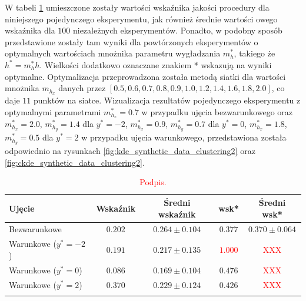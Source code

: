\documentclass[12pt,a4paper,oneside]{book}
\theoremstyle{definition}
\begin{document}
\noindent W tabeli \ref{table:synthetic_data_clustering} umieszczone zostały wartości wskaźnika jakości procedury dla niniejszego pojedynczego eksperymentu, jak również średnie wartości owego wskaźnika dla $100$ niezależnych eksperymentów. Ponadto, w podobny sposób przedstawione zostały tam wyniki dla powtórzonych eksperymentów o optymalnych wartościach mnożnika parametru wygładzania $m_h^*$, takiego że $h^*=m_h^*h$. Wielkości dodatkowo oznaczane znakiem * wskazują na wyniki optymalne. Optymalizacja przeprowadzona została metodą siatki dla wartości mnożnika $m_{h_x}$ danych przez $[0.5, 0.6, 0.7, 0.8, 0.9, 1.0, 1.2, 1.4, 1.6, 1.8, 2.0]$, co daje $11$ punktów na siatce. Wizualizacja rezultatów pojedynczego eksperymentu z optymalnymi parametrami $m_{h_x}^*=0.7$ w przypadku ujęcia bezwarunkowego oraz $m_{h_x}^*=2.0$, $m_{h_y}^*=1.4$ dla $y^*=-2$, $m_{h_x}^*=0.9$, $m_{h_y}^*=0.7$ dla $y^*=0$, $m_{h_x}^*=1.8$, $m_{h_y}^*=0.5$ dla $y^*=2$ w przypadku ujęcia warunkowego, przedstawiona została odpowiednio na rysunkach \ref{fig:kde_synthetic_data_clustering2} oraz \ref{fig:ckde_synthetic_data_clustering2}.
\begin{table}[H]
\caption{\textcolor{red}{Podpis.}}
\centering
\begin{tabular}{ lcccc }
\toprule
\textbf{Ujęcie} & \textbf{Wskaźnik} & \textbf{Średni wskaźnik} & \textbf{wsk*} & \textbf{Średni wsk*} \\ 
\toprule
\addlinespace[0.2cm]
Bezwarunkowe & $0.202$ & $0.264 \pm 0.104$ & $0.377$ & $0.370 \pm 0.064$ \\
\addlinespace[0.2cm]
Warunkowe ($y^*=-2$) & $0.191$ & $0.217 \pm 0.135$ & \textcolor{red}{$1.000$} & \textcolor{red}{XXX} \\
\addlinespace[0.2cm]
Warunkowe ($y^*=0$) & $0.086$ & $0.169 \pm 0.104$ & $0.476$ & \textcolor{red}{XXX} \\
\addlinespace[0.2cm]
Warunkowe ($y^*=2$) & $0.370$ & $0.229 \pm 0.124$ & $0.426$ & \textcolor{red}{XXX} \\
\addlinespace[0.1cm]
\bottomrule
\end{tabular}
\label{table:synthetic_data_clustering}
\end{table}
\end{document}
